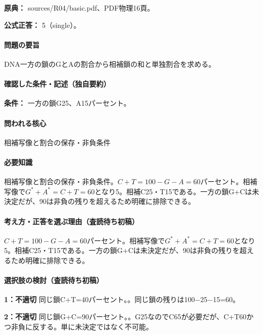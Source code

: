 \noindent\textbf{原典：} sources/R04/basic.pdf、PDF物理16頁。

\textbf{公式正答：} 5（single）。

\paragraph{問題の要旨} DNA一方の鎖のGとAの割合から相補鎖の和と単独割合を求める。

\paragraph{確認した条件・記述（独自要約）}\mbox{}\par

\noindent\textbf{条件：} 一方の鎖G25、A15パーセント。\par

\paragraph{問われる核心} 相補写像と割合の保存・非負条件

\paragraph{必要知識} 相補写像と割合の保存・非負条件。\(C+T=100-G-A=60\)パーセント。相補写像で\(G^{\ast}+A^{\ast}=C+T=60\)となり5。相補C25・T15である。一方の鎖G+Cは未決定だが、90は非負の残りを超えるため明確に排除できる。

\paragraph{考え方・正答を選ぶ理由（査読待ち初稿）} \(C+T=100-G-A=60\)パーセント。相補写像で\(G^{\ast}+A^{\ast}=C+T=60\)となり5。相補C25・T15である。一方の鎖G+Cは未決定だが、90は非負の残りを超えるため明確に排除できる。

\paragraph{選択肢の検討（査読待ち初稿）}\mbox{}\par

\noindent\textbf{1：不適切} 同じ鎖C+T=\allowbreak{}40パーセント。。同じ鎖の残りは100−25−15=\allowbreak{}60。\par

\noindent\textbf{2：不適切} 同じ鎖G+C=\allowbreak{}90パーセント。。G25なのでC65が必要だが、C+T60かつ非負に反する。単に未決定ではなく不可能。\par

